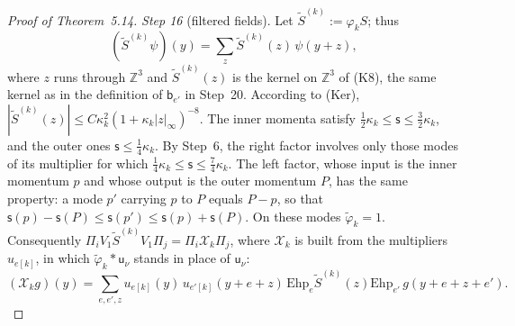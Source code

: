 \documentclass[11pt]{amsart}
\theoremstyle{definition}
\begin{document}
\begin{proof}[Proof of Theorem~5.14]
\emph{Step 16} (filtered fields).
Let $\tilde S^{(k)}:=\varphi_kS$; thus
\begin{equation*}
(\tilde S^{(k)}\psi)(y)=\sum_z\tilde S^{(k)}(z)\,\psi(y+z),
\end{equation*}
where $z$ runs through $\mathbb Z^3$ and $\tilde S^{(k)}(z)$ is the kernel on $\mathbb Z^3$ of (K8), the same kernel as in the definition of $\mathsf b_{e'}$ in Step~20.
According to (Ker), $|\tilde S^{(k)}(z)|\le C\kappa_k^2(1+\kappa_k|z|_\infty)^{-8}$.
The inner momenta satisfy $\frac12\kappa_k\le\mathsf s\le\frac32\kappa_k$, and the outer ones $\mathsf s\le\frac14\kappa_k$.
By Step~6, the right factor involves only those modes of its multiplier for which $\frac14\kappa_k\le\mathsf s\le\frac74\kappa_k$.
The left factor, whose input is the inner momentum $p$ and whose output is the outer momentum $P$, has the same property: a mode $p'$ carrying $p$ to $P$ equals $P-p$, so that $\mathsf s(p)-\mathsf s(P)\le\mathsf s(p')\le\mathsf s(p)+\mathsf s(P)$.
On these modes $\tilde\varphi_k=1$.
Consequently $\Pi_iV_1\tilde S^{(k)}V_1\Pi_j=\Pi_i\mathcal X_k\Pi_j$, where $\mathcal X_k$ is built from the multipliers $u_{e[k]}$, in which $\tilde\varphi_k*\mathsf u_\nu$ stands in place of $\mathsf u_\nu$:
\begin{equation*}
(\mathcal X_kg)(y)=\sum_{e,e',z}u_{e[k]}(y)\,u_{e'[k]}(y+e+z)\,\mathrm{Ehp}_e\tilde S^{(k)}(z)\mathrm{Ehp}_{e'}\,g(y+e+z+e').
\end{equation*}


\end{proof}
\end{document}
